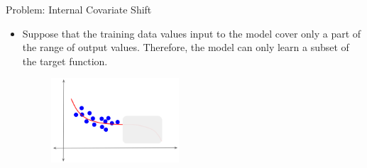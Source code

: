 \documentclass[serif, aspectratio=169]{beamer}
\begin{document}
\begin{frame}{Problem: Internal Covariate Shift}

\begin{itemize}

    \item Suppose that the training data values input to the model cover only a part of the range of output values. Therefore, the model can only learn a subset of the target function.

    \begin{figure}
        \includegraphics[width=0.45\textwidth]{pic/ICS-2.png}
        \label{fig:Training_data_distribution}
    \end{figure}

    \vfill

\end{itemize}

\end{frame}
\end{document}

